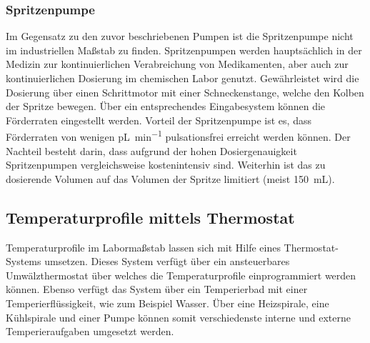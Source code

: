 \subsubsection*{Spritzenpumpe}
Im Gegensatz zu den zuvor beschriebenen Pumpen ist die Spritzenpumpe nicht im industriellen Maßstab zu finden. Spritzenpumpen werden hauptsächlich in der Medizin zur kontinuierlichen Verabreichung von Medikamenten, aber auch zur kontinuierlichen Dosierung im chemischen Labor genutzt. Gewährleistet wird die Dosierung über einen Schrittmotor mit einer Schneckenstange, welche den Kolben der Spritze bewegen. Über ein entsprechendes Eingabesystem können die Förderraten eingestellt werden. Vorteil der Spritzenpumpe ist es, dass Förderraten von wenigen \si{\pico \liter \per \minute} pulsationsfrei erreicht werden können. 
\newpage
Der Nachteil besteht darin, dass aufgrund der hohen Dosiergenauigkeit Spritzenpumpen vergleichsweise kostenintensiv sind. Weiterhin ist das zu dosierende Volumen auf das Volumen der Spritze limitiert (meist \SI{150}{\milli \liter}). \cite{Wikipedia.2020,legato_spritzenpumpe}

\subsection{Temperaturprofile mittels Thermostat}
Temperaturprofile im Labormaßstab lassen sich mit Hilfe eines Thermostat-Systems umsetzen. Dieses System verfügt über ein ansteuerbares Umwälzthermostat über welches die Temperaturprofile einprogrammiert werden können. Ebenso verfügt das System über ein  Temperierbad mit einer Temperierflüssigkeit, wie zum Beispiel Wasser. Über eine Heizspirale, eine Kühlspirale und einer Pumpe können somit verschiedenste interne und externe Temperieraufgaben umgesetzt werden.
